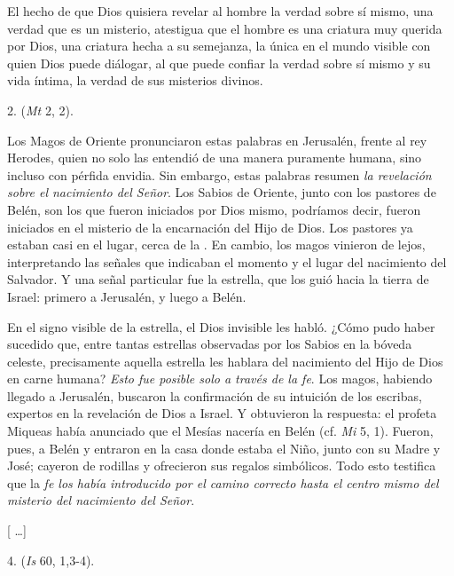 \begin{body}
	El hecho de que Dios quisiera revelar al hombre la verdad sobre sí mismo, una verdad que es un misterio, atestigua que el hombre es una criatura muy querida por Dios, una criatura hecha a su semejanza, la única en el mundo visible con quien Dios puede diálogar, al que puede confiar la verdad sobre sí mismo y su vida íntima, la verdad de sus misterios divinos.

	2.  (\emph{Mt} 2, 2).

	Los Magos de Oriente pronunciaron estas palabras en Jerusalén, frente al rey Herodes, quien no solo las entendió de una manera puramente humana, sino incluso con pérfida envidia. Sin embargo, estas palabras resumen \emph{la revelación sobre el nacimiento del Señor}. Los Sabios de Oriente, junto con los pastores de Belén, son los que fueron iniciados por Dios mismo, podríamos decir, fueron iniciados en el misterio de la encarnación del Hijo de Dios. Los pastores ya estaban casi en el lugar, cerca de la . En cambio, los magos vinieron de lejos, interpretando las señales que indicaban el momento y el lugar del nacimiento del Salvador. Y una señal particular fue la estrella, que los guió hacia la tierra de Israel: primero a Jerusalén, y luego a Belén.

	En el signo visible de la estrella, el Dios invisible les habló. ¿Cómo pudo haber sucedido que, entre tantas estrellas observadas por los Sabios en la bóveda celeste, precisamente aquella estrella les hablara del nacimiento del Hijo de Dios en carne humana? \emph{Esto fue posible solo a través de la fe}. Los magos, habiendo llegado a Jerusalén, buscaron la confirmación de su intuición de los escribas, expertos en la revelación de Dios a Israel. Y obtuvieron la respuesta: el profeta Miqueas había anunciado que el Mesías nacería en Belén (cf. \emph{Mi} 5, 1). Fueron, pues, a Belén y entraron en la casa donde estaba el Niño, junto con su Madre y José; cayeron de rodillas y ofrecieron sus regalos simbólicos. Todo esto testifica que la \emph{fe los había introducido por el camino correcto hasta el centro mismo del misterio del nacimiento del Señor}.

	{[} \ldots{}{]}

	4.  (\emph{Is} 60, 1,3-4).


\end{body}
